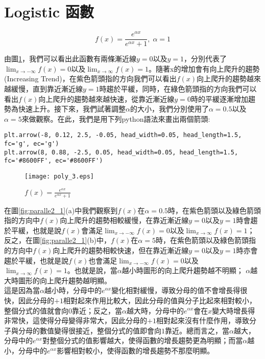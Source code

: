 \documentclass[12pt, a4paper]{article}
\begin{document}
\section{Logistic 函數}
\begin{equation}\label{eq:equation_2}
f(x)=\frac{e^{\alpha x}}{e^{\alpha x}+1},\;\alpha=1
\end{equation}

由圖\;\ref{fig:poly_3.eps}，我們可以看出此函數有兩條漸近線\;$y=0$\;以及\;$y=1$\;，分別代表了\\\;$\lim_{x\rightarrow -\infty} f(x)=0$\;以及\;$\lim_{x\rightarrow \infty} f(x)=1$\;。隨著x的增加會有向上爬升的趨勢(Increasing Trend)，在紫色箭頭指的方向我們可以看出\;$f(x)$\;向上爬升的趨勢越來越緩慢，直到靠近漸近線\;$y=1$\;時趨於平緩，同時，在綠色箭頭指的方向我們可以看出\;$f(x)$\;向上爬升的趨勢越來越快速，從靠近漸近線\;$y=0$\;時的平緩逐漸增加趨勢為快速上升。接下來，我們試著調整\;$\alpha$\;的大小，我們分別使用了\;$\alpha =0.5$\;以及\;$\alpha =5$\;來做觀察。在此，我們是用下列python語法來畫出兩個箭頭\;:
\begin{lstlisting}
plt.arrow(-8, 0.12, 2.5, -0.05, head_width=0.05, head_length=1.5, fc='g', ec='g')
plt.arrow(8, 0.88, -2.5, 0.05, head_width=0.05, head_length=1.5, fc='#8600FF', ec='#8600FF')
\end{lstlisting}

\begin{figure}[h]
\centering
\texttt{[image: poly\_3.eps]}
\caption{$f(x)=\frac{e^{\alpha x}}{e^{\alpha x}+1}$}
\label{fig:poly_3.eps}
\end{figure}

在圖\;\ref{fig:paralle2_1}\;(a)\;中我們觀察到\;$f(x)$\;在\;$\alpha=0.5$\;時，在紫色箭頭以及綠色箭頭指的方向中\;$f(x)$\;向上爬升的趨勢相較緩慢，在靠近漸近線\;$y=0$\;以及\;$y=1$\;時會趨於平緩，也就是說\;$f(x)$\;會滿足\;$\lim_{x\rightarrow -\infty} f(x)=0$\;以及\;$\lim_{x\rightarrow \infty} f(x)=1$\;；反之，在圖\;\ref{fig:paralle2_1}\;(b)\;中，\;$f(x)$\;在\;$\alpha=5$\;時，在紫色箭頭以及綠色箭頭指的方向中\;$f(x)$\;向上爬升的趨勢相較快速，但在靠近漸近線\;$y=0$\;以及\;$y=1$\;時亦會趨於平緩，也就是說\;$f(x)$\;也會滿足\;$\lim_{x\rightarrow -\infty} f(x)=0$\;以及\;$\lim_{x\rightarrow \infty} f(x)=1$\;。也就是說，當\;$\alpha$\;越小時圖形的向上爬升趨勢越不明顯；
\;$\alpha$\;越大時圖形的向上爬升趨勢越明顯。\\
這是因為當\;$\alpha$\;越小時，分母中的\;$e^{\alpha x}$\;變化相對緩慢，導致分母的值不會增長得很快，因此分母的\;$+1$\;相對起來作用比較大，因此分母的值與分子比起來相對較小，整個分式的值就會向\;$0$\;靠近；反之，當\;$\alpha$\;越大時，分母中的\;$e^{\alpha x}$\;會在\;$x$\;變大時增長得非常快，這使得分母變得非常大，因此分母的\;$+1$\;相對起來沒有什麼作用，導致分子與分母的數值變得很接近，整個分式的值即會向\;$1$\;靠近。總而言之，當\;$\alpha$\;越大，分母中的\;$e^{\alpha x}$\;對整個分式的值影響越大，使得函數的增長趨勢更為明顯；而當\;$\alpha$\;越小，分母中的\;$e^{\alpha x}$\;影響相對較小，使得函數的增長趨勢不那麼明顯。
\end{document}
